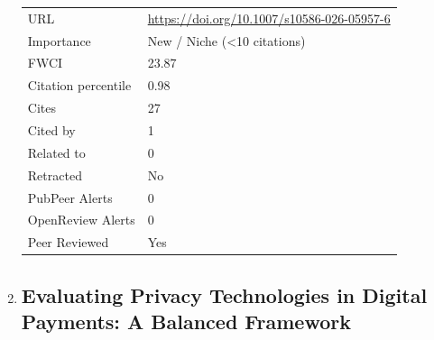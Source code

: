 \documentclass{article}
\begin{document}
\begin{enumerate}[label=\arabic*., font=\Large]
\begin{longtable}{p{} p{\contentcolwidth-2\tabcolsep}}
URL & \href{https://doi.org/10.1007/s10586-026-05957-6}{https://doi.org/10.1007/s10586-026-05957-6} \\
Importance & New / Niche (<10 citations) \\
FWCI & 23.87 \\
Citation percentile & 0.98 \\
Cites & 27 \\
Cited by & 1 \\
Related to & 0 \\
Retracted & No \\
PubPeer Alerts & 0 \\
OpenReview Alerts & 0 \\
Peer Reviewed & Yes \\
\bottomrule
\end{longtable}

\item
{}\label{evaluating-privacy-technologies-in-digital-payments-a-balanced-framework}
\hypertarget{item_FRAGKIADAKISEvaluatingPrivacyTechnologiesDigitalPaymentsBalanced2025}{}
\subsection*{Evaluating Privacy Technologies in Digital Payments: A Balanced Framework}


\end{enumerate}
\end{document}
